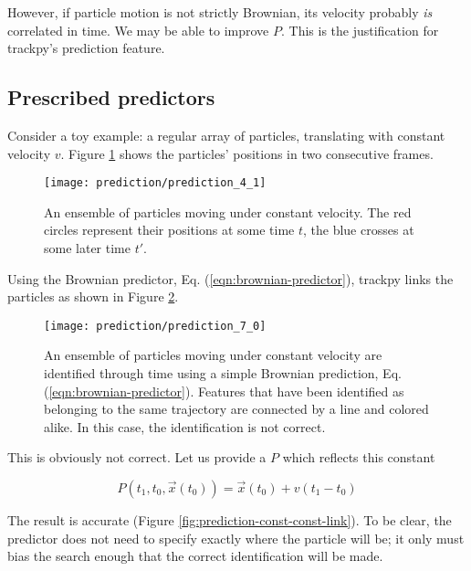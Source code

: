 However, if particle motion is not strictly Brownian, its velocity
probably \emph{is} correlated in time. We may be able to improve $P$. This 
is the justification for trackpy's prediction feature.

\subsection{Prescribed predictors}\label{prescribed-predictors}

Consider a toy example: a regular array of particles,
translating with constant velocity $v$. Figure \ref{fig:prediction-const-features}
shows the particles' positions in two consecutive frames.

    \begin{figure}
    \centering
    \texttt{[image: prediction/prediction\_4\_1]}
    \caption[An ensemble of particles moving under constant velocity.]{\label{fig:prediction-const-features}An ensemble of particles moving under constant velocity. The red circles represent their positions at some time $t$, the blue crosses at some later time $t'$.}
    \end{figure}

\noindent Using the Brownian predictor, Eq. (\ref{eqn:brownian-predictor}), trackpy links the particles as shown in Figure \ref{fig:prediction-const-brownian-link}.

   \begin{figure}
    \centering
    \texttt{[image: prediction/prediction\_7\_0]}
    \caption[An ensemble of particles moving under constant velocity are identified through time using a simple Brownian prediction.]{\label{fig:prediction-const-brownian-link}An ensemble of particles moving under constant velocity are identified through time using a simple Brownian prediction, Eq. (\ref{eqn:brownian-predictor}). Features that have been identified as belonging to the same trajectory are connected by a line and colored alike. In this case, the identification is not correct.}
    \end{figure}
    
\noindent This is obviously not correct. Let us provide a $P$ which reflects this constant

\begin{equation}
\label{eqn:const-predictor}
P(t_1, t_0, \vec x(t_0)) = \vec x(t_0) + v(t_1 - t_0)
\end{equation}

\noindent The result is accurate (Figure \ref{fig:prediction-const-const-link}). To be clear, the predictor does not need to specify exactly where the
particle will be; it only must bias the search enough that the correct
identification will be made.

